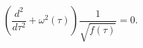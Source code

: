 \begin{equation}\label{TintoTau}
 \left(\frac{d^2}{d\tau^2}+
 \omega^2(\tau)\right)\frac{1}{\sqrt{\dot f(\tau)}}=0.
\end{equation}

